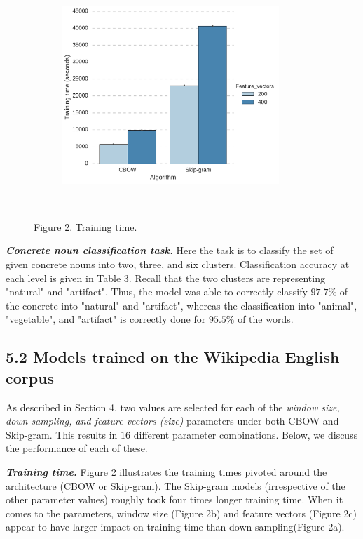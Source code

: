 \documentclass[12pt]{report}
\begin{document}
\begin{figure}
\begin{subfigure}[b]{0.49\textwidth}
		\includegraphics[width=0.9\textwidth]{./Figures/TrainTime-Feature_vectors.pdf}
		\caption{}
		\label{fig:fv}
	\end{subfigure}\\
	\caption*{Figure 2. Training time.}
	\label{fig:traintime}
\end{figure}

\noindent\textbf{\emph{Concrete noun classification task.}} Here the task is to classify the set of given concrete nouns into two, three, and six clusters. Classification accuracy at each level is given in Table 3. Recall that the two clusters are representing "natural" and "artifact". Thus, the model was able to correctly classify  $97.7 \%$ of the concrete into "natural" and "artifact", whereas the classification into "animal", "vegetable", and "artifact" is correctly done for $95.5 \%$ of the words. 

\subsection*{5.2 Models trained on the Wikipedia English corpus}
As described in Section 4, two values are selected for each of the \emph{window size, down sampling, \emph{and} feature vectors (size)} parameters under both CBOW and Skip-gram. This results in 
$16$ different parameter combinations. Below, we discuss the performance of each of these.

\noindent\textbf{\emph{Training time.}} Figure 2 illustrates the training times pivoted around 
the architecture (CBOW or Skip-gram). The Skip-gram models (irrespective of the other parameter 
values) roughly took four times longer training time. When it comes to the parameters, window 
size (Figure 2b) and feature vectors (Figure 2c) appear to have larger impact on training time 
than down sampling(Figure 2a).
\end{document}
